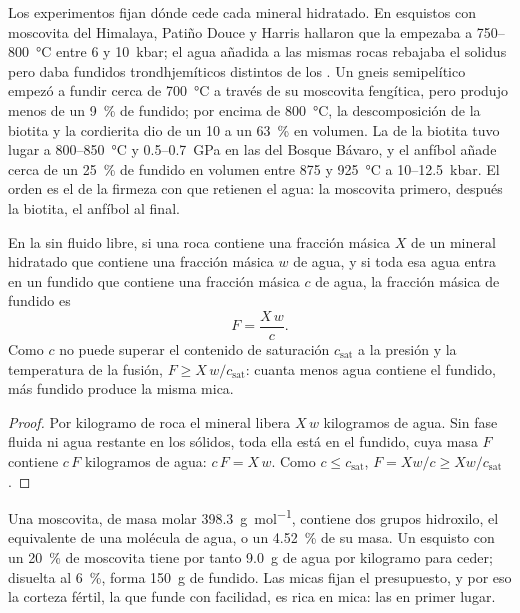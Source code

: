 Los experimentos fijan dónde cede cada mineral hidratado. En esquistos con moscovita del
Himalaya, Patiño Douce y Harris hallaron que la  empezaba a 750--\qty{800}{\celsius}
entre 6 y \qty{10}{kbar}; el agua añadida a las mismas rocas rebajaba el
solidus pero daba fundidos trondhjemíticos distintos de los . Un gneis semipelítico
empezó a fundir cerca de \qty{700}{\celsius} a través de su moscovita fengítica, pero produjo menos
de un \qty{9}{\percent} de fundido; por encima de \qty{800}{\celsius}, la descomposición de la biotita y la
cordierita dio de un 10 a un \qty{63}{\percent} en volumen. La  de la biotita tuvo lugar
a 800--\qty{850}{\celsius} y 0.5--\qty{0.7}{GPa} en las  del
Bosque Bávaro, y el anfíbol añade cerca de un \qty{25}{\percent} de fundido en volumen entre 875
y \qty{925}{\celsius} a 10--\qty{12.5}{kbar}. El orden es el de la firmeza con que retienen el agua:
la moscovita primero, después la biotita, el anfíbol al final.

\begin{proposition}\label{prop:b2:crustal-melting:water}
En la  sin fluido libre, si una roca contiene una fracción másica $X$ de un
mineral hidratado que contiene una fracción másica $w$ de agua, y si toda esa agua entra en un
fundido que contiene una fracción másica $c$ de agua, la fracción másica de fundido es
\[F = \frac{X\,w}{c}.\]
Como $c$ no puede superar el contenido de saturación $c_{\mathrm{sat}}$ a la presión y la
temperatura de la fusión, $F \ge X\,w/c_{\mathrm{sat}}$: cuanta menos agua contiene el fundido,
más fundido produce la misma mica.
\end{proposition}

\begin{proof}
Por kilogramo de roca el mineral libera $X\,w$ kilogramos de agua. Sin fase fluida
ni agua restante en los sólidos, toda ella está en el fundido, cuya masa $F$ contiene $c\,F$
kilogramos de agua: $c\,F = X\,w$. Como $c \le c_{\mathrm{sat}}$, $F = Xw/c \ge
Xw/c_{\mathrm{sat}}$.
\end{proof}

Una moscovita,  de masa molar \qty{398.3}{\gram\per\mole}, contiene dos
grupos hidroxilo, el equivalente de una molécula de agua, o un \qty{4.52}{\percent} de su
masa. Un esquisto con un \qty{20}{\percent} de moscovita tiene por tanto \qty{9.0}{\gram} de agua
por kilogramo para ceder; disuelta al \qty{6}{\percent}, forma \qty{150}{\gram} de
fundido. Las micas fijan el presupuesto, y por eso la corteza fértil, la que funde con facilidad,
es rica en mica: las  en primer lugar.

